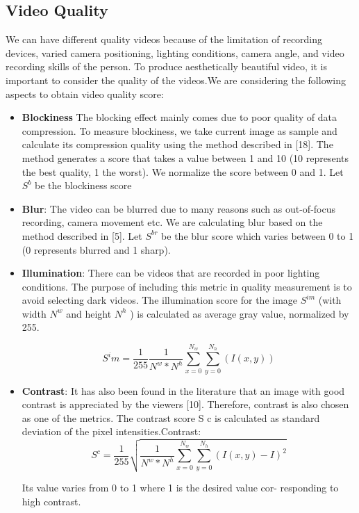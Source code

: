 \documentclass{sig-alternate}
\begin{document}
\subsection{Video Quality}
We can have different quality videos because of the limitation of
recording devices, varied camera positioning, lighting conditions,
camera angle, and video recording skills of the person. To produce
aesthetically beautiful video, it is important to consider the quality
of the videos.We are considering the following aspects to obtain
video quality score:

\begin{itemize}
    \item \textbf{Blockiness} The blocking effect mainly comes due to poor
quality of data compression. To measure blockiness, we take
current image as sample and calculate its compression quality using the method described in [18]. The method generates
a score that takes a value between 1 and 10 (10 represents the
best quality, 1 the worst). We normalize the score between 0
and 1. Let $S^b$ be the blockiness score

\item \textbf{Blur}: The video can be blurred due to many reasons such as
out-of-focus recording, camera movement etc. We are calculating blur based on the method described in [5]. Let $S^{br}$
be the blur score which varies between 0 to 1 (0 represents
blurred and 1 sharp).

\item  \textbf {Illumination}: There can be videos that are recorded in poor
lighting conditions. The purpose of including this metric in
quality measurement is to avoid selecting dark videos. The
illumination score for the image $S^{im}$ (with width $N^{w}$ and
height $N^{h}$ ) is calculated as average gray value, normalized
by 255.

$$S^im= \frac{1}{255} \frac{1}{N^w * N^h}  \sum_{x=0}^{N_w} \sum_{y=0}^{N_h} (I(x,y))$$


\item  \textbf{Contrast}: It has also been found in the literature that an image with good contrast is appreciated by the viewers [10].
Therefore, contrast is also chosen as one of the metrics. The
contrast score S c is calculated as standard deviation of the
pixel intensities.Contrast:\\
$$S^c= \frac{1}{255} \sqrt{ \frac{1}{N^w * N^h}  \sum_{x=0}^{N_w} \sum_{y=0}^{N_h} (I(x,y)-I)^2}$$
\sum

    Its value varies from 0 to 1 where 1 is the desired value cor-
responding to high contrast.


\end{itemize}
\end{document}
